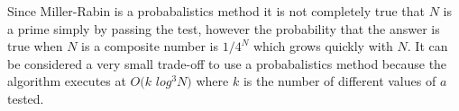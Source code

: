 Since Miller-Rabin is a probabalistics method it is not completely true that $N$ is a prime simply by passing the test, however the probability that the answer is true when $N$ is a composite number is $1 / 4^{N}$ which grows quickly with $N$. It can be considered a very small trade-off to use a probabalistics method because the algorithm executes at $O(k$ $log^3 N)$ where $k$ is the number of different values of $a$ tested. \cite{miller}
